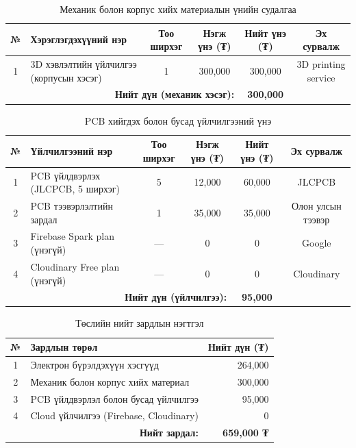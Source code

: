 \documentclass[12pt,a4paper]{report}
\begin{document}
\begin{table}[H]
\centering
\scriptsize
\caption{Механик болон корпус хийх материалын үнийн судалгаа}
\label{tab:price-mechanical}
\begin{tabularx}{\textwidth}{|c|X|c|c|c|c|}
\hline
\textbf{№} & \textbf{Хэрэглэгдэхүүний нэр} & \textbf{Тоо ширхэг} & \textbf{Нэгж үнэ (₮)} & \textbf{Нийт үнэ (₮)} & \textbf{Эх сурвалж} \\ \hline
1 & 3D хэвлэлтийн үйлчилгээ (корпусын хэсэг)    & 1   & 300{,}000 & 300{,}000 & 3D printing service \\ \hline
\multicolumn{4}{|r|}{\textbf{Нийт дүн (механик хэсэг):}} & \textbf{300{,}000} & \\ \hline
\end{tabularx}
\end{table}

\begin{table}[H]
\centering
\scriptsize
\caption{PCB хийгдэх болон бусад үйлчилгээний үнэ}
\label{tab:price-services}
\begin{tabularx}{\textwidth}{|c|X|c|c|c|c|}
\hline
\textbf{№} & \textbf{Үйлчилгээний нэр} & \textbf{Тоо ширхэг} & \textbf{Нэгж үнэ (₮)} & \textbf{Нийт үнэ (₮)} & \textbf{Эх сурвалж} \\ \hline
1 & PCB үйлдвэрлэх (JLCPCB, 5 ширхэг)        & 5 & 12{,}000 & 60{,}000 & JLCPCB \\ \hline
2 & PCB тээвэрлэлтийн зардал                  & 1 & 35{,}000 & 35{,}000 & Олон улсын тээвэр \\ \hline
3 & Firebase Spark plan (үнэгүй)              & — & 0        & 0        & Google \\ \hline
4 & Cloudinary Free plan (үнэгүй)             & — & 0        & 0        & Cloudinary \\ \hline
\multicolumn{4}{|r|}{\textbf{Нийт дүн (үйлчилгээ):}} & \textbf{95{,}000} & \\ \hline
\end{tabularx}
\end{table}

\begin{table}[H]
\centering
\caption{Төслийн нийт зардлын нэгтгэл}
\label{tab:price-total}
\begin{tabularx}{\textwidth}{|c|X|r|}
\hline
\textbf{№} & \textbf{Зардлын төрөл} & \textbf{Нийт дүн (₮)} \\ \hline
1 & Электрон бүрэлдэхүүн хэсгүүд           & 264{,}000 \\ \hline
2 & Механик болон корпус хийх материал     & 300{,}000 \\ \hline
3 & PCB үйлдвэрлэл болон бусад үйлчилгээ   & 95{,}000 \\ \hline
4 & Cloud үйлчилгээ (Firebase, Cloudinary) & 0 \\ \hline
\multicolumn{2}{|r|}{\textbf{Нийт зардал:}} & \textbf{659{,}000 ₮} \\ \hline
\end{tabularx}
\end{table}
\end{document}
